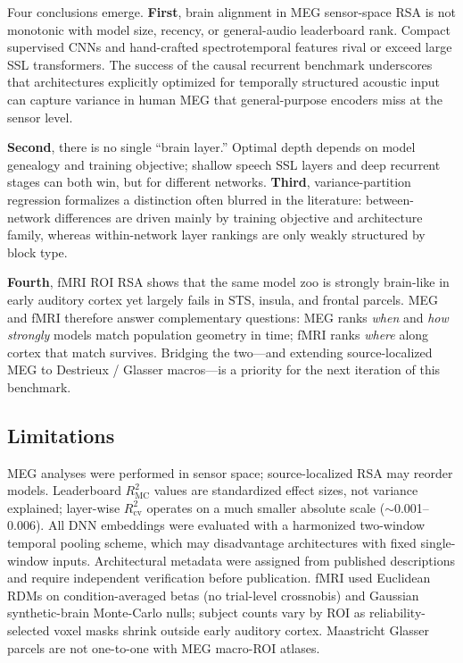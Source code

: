 \documentclass[11pt,a4paper]{article}
\begin{document}
Four conclusions emerge. \textbf{First}, brain alignment in MEG sensor-space RSA is not monotonic with model size, recency, or general-audio leaderboard rank. Compact supervised CNNs and hand-crafted spectrotemporal features rival or exceed large SSL transformers. The success of the causal recurrent benchmark underscores that architectures explicitly optimized for temporally structured acoustic input can capture variance in human MEG that general-purpose encoders miss at the sensor level.

\textbf{Second}, there is no single ``brain layer.'' Optimal depth depends on model genealogy and training objective; shallow speech SSL layers and deep recurrent stages can both win, but for different networks. \textbf{Third}, variance-partition regression formalizes a distinction often blurred in the literature: between-network differences are driven mainly by training objective and architecture family, whereas within-network layer rankings are only weakly structured by block type.

\textbf{Fourth}, fMRI ROI RSA shows that the same model zoo is strongly brain-like in early auditory cortex yet largely fails in STS, insula, and frontal parcels. MEG and fMRI therefore answer complementary questions: MEG ranks \emph{when} and \emph{how strongly} models match population geometry in time; fMRI ranks \emph{where} along cortex that match survives. Bridging the two---and extending source-localized MEG to Destrieux / Glasser macros---is a priority for the next iteration of this benchmark.

\subsection{Limitations}

MEG analyses were performed in sensor space; source-localized RSA may reorder models. Leaderboard $R^2_{\mathrm{MC}}$ values are standardized effect sizes, not variance explained; layer-wise $R^2_{\mathrm{cv}}$ operates on a much smaller absolute scale ($\sim$0.001--0.006). All DNN embeddings were evaluated with a harmonized two-window temporal pooling scheme, which may disadvantage architectures with fixed single-window inputs. Architectural metadata were assigned from published descriptions and require independent verification before publication. fMRI used Euclidean RDMs on condition-averaged betas (no trial-level crossnobis) and Gaussian synthetic-brain Monte-Carlo nulls; subject counts vary by ROI as reliability-selected voxel masks shrink outside early auditory cortex. Maastricht Glasser parcels are not one-to-one with MEG macro-ROI atlases.
\end{document}
